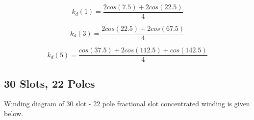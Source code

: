 \documentclass{reportClass}
\begin{document}
\begin{equation*}
    k_d(1) = \dfrac{2cos(7.5)+2cos(22.5)}{4}
\end{equation*}

\begin{equation*}
    k_d(3) = \dfrac{2cos(22.5)+2cos(67.5)}{4}
\end{equation*}

\begin{equation*}
    k_d(5) = \dfrac{cos(37.5)+2cos(112.5)+cos(142.5)}{4}
\end{equation*}
\subsection{30 Slots, 22 Poles}



Winding diagram of 30 slot - 22 pole fractional slot concentrated winding is given below.
\end{document}
